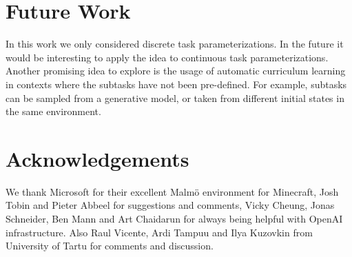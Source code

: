 \documentclass{article}
\begin{document}
\section{Future Work}
In this work we only considered discrete task parameterizations. In the future it would be interesting to apply the idea to continuous task parameterizations. Another promising idea to explore is the usage of automatic curriculum learning in contexts where the subtasks have not been pre-defined. For example, subtasks can be sampled from a generative model, or taken from different initial states in the same environment.

\section{Acknowledgements}
We thank Microsoft for their excellent Malmö environment for Minecraft, Josh Tobin and Pieter Abbeel for suggestions and comments, Vicky Cheung, Jonas Schneider, Ben Mann and Art Chaidarun for always being helpful with OpenAI infrastructure. Also Raul Vicente, Ardi Tampuu and Ilya Kuzovkin from University of Tartu for comments and discussion.
\nocite{*}



\clearpage

\end{document}
